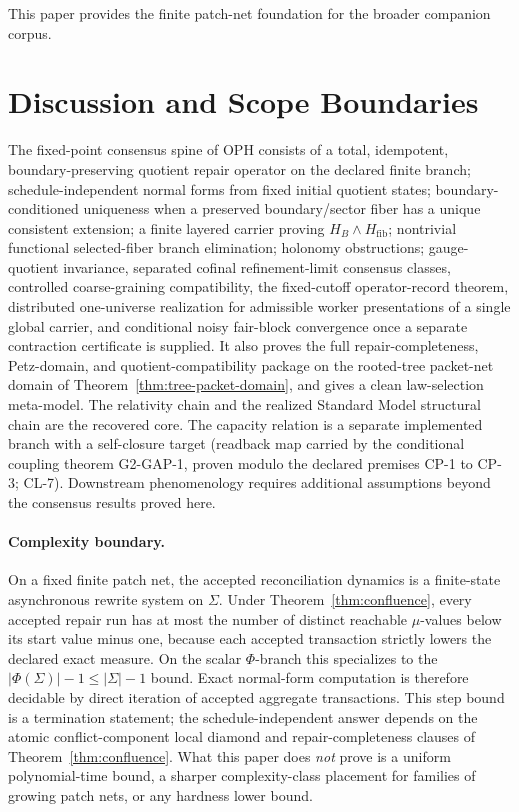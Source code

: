 \documentclass[11pt]{article}
\theoremstyle{remark}
\theoremstyle{plain}
\begin{document}
This paper provides the finite patch-net foundation for the broader companion corpus.


\section{Discussion and Scope Boundaries}

The fixed-point consensus spine of OPH consists of a total, idempotent,
boundary-preserving quotient repair operator on the declared finite branch; schedule-independent
normal forms from fixed initial quotient states; boundary-conditioned uniqueness when a preserved
boundary/sector fiber has a unique consistent extension; a finite layered carrier proving
\(H_B\wedge H_{\mathrm{fib}}\); nontrivial functional selected-fiber branch elimination;
holonomy obstructions; gauge-quotient invariance,
separated cofinal refinement-limit consensus classes, controlled coarse-graining compatibility,
the fixed-cutoff operator-record theorem, distributed one-universe realization for admissible
worker presentations of a single global carrier, and conditional noisy fair-block convergence once a
separate contraction certificate is supplied.
It also proves the full repair-completeness, Petz-domain, and quotient-compatibility package on
the rooted-tree packet-net domain of Theorem~\ref{thm:tree-packet-domain}, and gives a clean
law-selection meta-model. The relativity chain and the realized Standard Model
structural chain are the recovered core. The capacity relation is a separate implemented branch
with a self-closure target (readback map carried by the conditional coupling theorem G2-GAP-1, proven modulo the declared premises CP-1 to CP-3; CL-7). Downstream phenomenology requires additional assumptions
beyond the consensus results proved here.

\paragraph{Complexity boundary.}
On a fixed finite patch net, the accepted reconciliation dynamics is a finite-state asynchronous
rewrite system on \(\Sigma\). Under Theorem~\ref{thm:confluence}, every accepted repair run has at
most the number of distinct reachable \(\mu\)-values below its start value minus one, because each
accepted transaction strictly lowers the declared exact measure. On the scalar \(\Phi\)-branch
this specializes to the \(|\Phi(\Sigma)|-1\le |\Sigma|-1\) bound. Exact normal-form
computation is therefore decidable by direct iteration of accepted aggregate transactions. This
step bound is a termination statement; the schedule-independent answer depends on the atomic
conflict-component local diamond and repair-completeness clauses of Theorem~\ref{thm:confluence}.
What this paper does
\emph{not} prove is a uniform polynomial-time bound, a sharper complexity-class placement for
families of growing patch nets, or any hardness lower bound.
\end{document}
